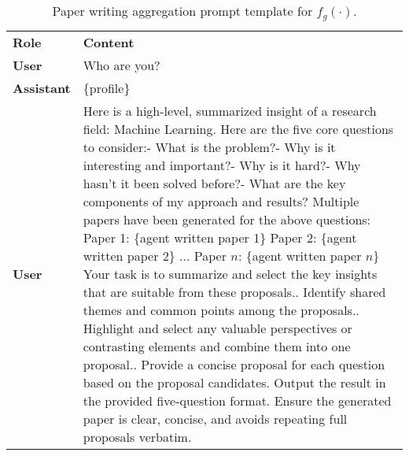 \begin{table*}[ht]
\centering
\footnotesize
\renewcommand{\arraystretch}{1.3}
\begin{tabular}{p{1cm}p{11.5cm}}
\toprule[1.5pt]
\textbf{Role} & \textbf{Content} \\ 
\cmidrule[0.5pt](lr){1-2}
\textbf{User} & Who are you? \\ 
\midrule
\textbf{Assistant} & \{profile\}\\
\midrule
\textbf{User} & Here is a high-level, summarized insight of a research field: Machine Learning.\newline
Here are the five core questions to consider:\newline
[Question 1] - What is the problem?\newline
[Question 2] - Why is it interesting and important?\newline
[Question 3] - Why is it hard?\newline
[Question 4] - Why hasn't it been solved before?\newline
[Question 5] - What are the key components of my approach and results?\newline
Multiple papers have been generated for the above questions:\newline
Paper 1: \{agent written paper 1\}\newline
Paper 2: \{agent written paper 2\}\newline
...\newline 
Paper $n$: \{agent written paper $n$\}\newline
Your task is to summarize and select the key insights that are suitable from these proposals.\newline
1. Identify shared themes and common points among the proposals.\newline
2. Highlight and select any valuable perspectives or contrasting elements and combine them into one proposal.\newline
3. Provide a concise proposal for each question based on the proposal candidates.\newline
Output the result in the provided five-question format.\newline
Ensure the generated paper is clear, concise, and avoids repeating full proposals verbatim.\\
\bottomrule[1.5pt]
\end{tabular}
\caption{Paper writing aggregation prompt template for $f_g(\cdot)$.}
\label{tab:Paper_Writing_Summary_Prompt}
\end{table*}

